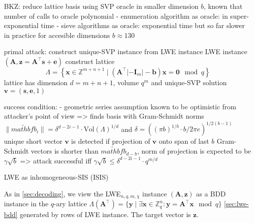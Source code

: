 BKZ: reduce lattice basis using SVP oracle in smaller dimension $b$, known that number of calls to oracle polynomial
- enumeration algorithm as oracle: in super-exponential time
- sieve algorithms as oracle: exponential time but so far slower in practice for accesible dimensions $b\approx 130$

primal attack: construct unique-SVP instance from LWE instance %
LWE instance $(\mathbf{A}, \mathbf{z} = \mathbf{A}^\intercal \mathbf{s} + \mathbf{e})$
construct lattice 
\begin{equation}
  \Lambda = \left\{ \mathbf{x} \in \mathbb{Z}^{m+n+1} \mid (\mathbf{A}^\intercal | -\mathbf{I}_m | -\mathbf{b})\mathbf{x} = \mathbf{0} \mod q \right\} 
\end{equation}
lattice has dimension $d=m+n+1$, volume $q^m$ %
and unique-SVP solution $\mathbf{v} = (\mathbf{s}, \mathbf{e}, 1)$ %

success condition:
- geometric series assumption known to be optimistic from attacker's point of view
=> finds basis with Gram-Schmidt norms $\|\tilde{mathbf{b}}_i\| = \delta^{d - 2i-1} \cdot \text{Vol}(\Lambda)^{1/d}$ and $\delta = ((\pi b)^{1/b} \cdot b/2\pi e)^{1/2(b-1)}$ %
unique short vector $\mathbf{v}$ is detected if projection of $\mathbf{v}$ onto span of last $b$ Gram-Schmidt vectors is shorter than $\tilde{mathbf{b}}_{d-b}$, norm of projection is expected to be $\gamma \sqrt{b}$ => attack successful iff $\gamma \sqrt{b} \leq \delta^{d - 2i-1} \cdot q^{m/d}$

LWE as inhomogeneous-SIS (ISIS)

As in \cref{sec:decoding}, we view the LWE$_{n, q, m, \chi}$ instance $(\mathbf{A}, \mathbf{z})$ as a BDD instance in the  $q$-ary lattice $\Lambda(\mathbf{A}^\intercal) = \{ \mathbf{y} \mid \exists \mathbf{x} \in \mathbb{Z}_q^n : \mathbf{y} = \mathbf{A}^\intercal \mathbf{x}  \mod q \}$ \cref{sec:lwe-bdd} generated by rows of LWE instance. The target vector is $\mathbf{z}$. %

